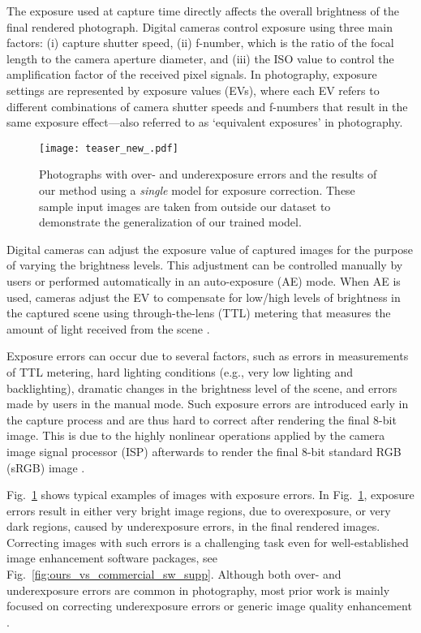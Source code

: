 \documentclass[final]{cvpr}
\begin{document}
The exposure used at capture time directly affects the overall brightness of the final rendered photograph. Digital cameras control exposure using three main factors: (i) capture shutter speed, (ii) f-number, which is the ratio of the focal length to the camera aperture diameter, and (iii) the ISO value to control the amplification factor of the received pixel signals. In photography, exposure settings are represented by exposure values (EVs), where each EV refers to different combinations of camera shutter speeds and f-numbers that result in the same exposure effect---also referred to as `equivalent exposures' in photography.

\begin{figure}[t]
\centering
\texttt{[image: teaser\_new\_.pdf]}
\vspace{-6mm}
\caption{Photographs with over- and underexposure errors and the results of our method using a \textit{single} model for exposure correction. These sample input images are taken from outside our dataset to demonstrate the generalization of our trained model.\vspace{-4mm}}
\label{fig:teaser}
\end{figure}

Digital cameras can adjust the exposure value of captured images for the purpose of varying the brightness levels. This adjustment can be controlled manually by users or performed automatically in an auto-exposure (AE) mode. When AE is used, cameras adjust the EV to compensate for low/high levels of brightness in the captured scene using through-the-lens (TTL) metering that measures the amount of light received from the scene \cite{peterson2016understanding}.

Exposure errors can occur due to several factors, such as errors in measurements of TTL metering, hard lighting conditions (e.g., very low lighting and backlighting), dramatic changes in the brightness level of the scene, and errors made by users in the manual mode. Such exposure errors are introduced early in the capture process and are thus hard to correct after rendering the final 8-bit image. This is due to the highly nonlinear operations applied by the camera image signal processor (ISP) afterwards to render the final 8-bit standard RGB (sRGB) image \cite{karaimer2016software}.

Fig.\ \ref{fig:teaser} shows typical examples of images with exposure errors. In Fig.\ \ref{fig:teaser}, exposure errors result in either very bright image regions, due to overexposure, or very dark regions, caused by underexposure errors, in the final rendered images. Correcting images with such errors is a challenging task even for well-established image enhancement software packages, see Fig.\ \ref{fig:ours_vs_commercial_sw_supp}. Although both over- and underexposure errors are common in photography, most prior work is mainly focused on correcting underexposure errors \cite{guo2017lime, HQEC, Chen2018Retinex, zhang2019kindling, DeepUPE} or generic image quality enhancement \cite{HDRNET, DPE}.
\end{document}
